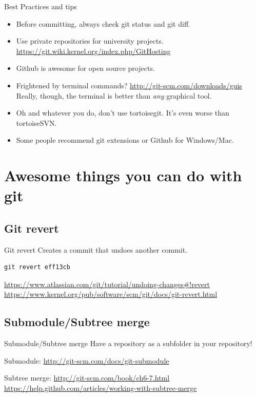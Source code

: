 \documentclass[10pt,a4paper]{beamer}
\begin{document}
\begin{frame}[fragile]{Best Practices and tips}
\begin{itemize}
\item Before committing, always check git status and git diff.
\pause
\item Use private repositories for university projects.
\href{https://git.wiki.kernel.org/index.php/GitHosting}{\color{blue}https://git.wiki.kernel.org/index.php/GitHosting}
\item Github is awesome for open source projects.
\pause
\item Frightened by terminal commands?
\href{http://git-scm.com/downloads/guis}{\color{blue}http://git-scm.com/downloads/guis} \\
Really, though, the terminal is better than \textit{any} graphical tool.
\pause
\item Oh and whatever you do, don't use tortoisegit. It's even worse than tortoiseSVN.
\pause
\item Some people recommend git extensions or Github for Windows/Mac.
\end{itemize}
\end{frame}


\section{Awesome things you can do with git}

\subsection{Git revert}
\begin{frame}[fragile]{Git revert}
Creates a commit that undoes another commit.
\begin{verbatim}git revert eff13cb\end{verbatim}
\href{https://www.atlassian.com/git/tutorial/undoing-changes#!revert}{\color{blue}https://www.atlassian.com/git/tutorial/undoing-changes\#!revert}
\href{https://www.kernel.org/pub/software/scm/git/docs/git-revert.html}{\color{blue}https://www.kernel.org/pub/software/scm/git/docs/git-revert.html}

\end{frame}

\subsection{Submodule/Subtree merge}
\begin{frame}{Submodule/Subtree merge}
Have a repository as a subfolder in your repository!

Submodule:
\href{http://git-scm.com/docs/git-submodule}{\color{blue}http://git-scm.com/docs/git-submodule}

Subtree merge:
\href{http://git-scm.com/book/ch6-7.html}{\color{blue}http://git-scm.com/book/ch6-7.html}
\href{https://help.github.com/articles/working-with-subtree-merge}{\color{blue}https://help.github.com/articles/working-with-subtree-merge}
\end{frame}
\end{document}
